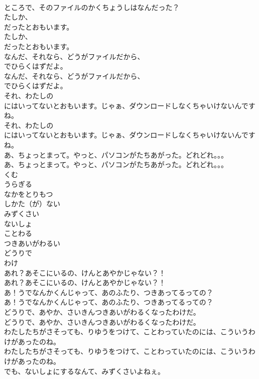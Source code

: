\documentclass[8pt]{extreport}
\begin{document}
\begin{CJK}{UTF8}{min}
\\	ところで、そのファイルのかくちょうしはなんだった？
\\	たしか、
\\	だったとおもいます。
\\	たしか、
\\	だったとおもいます。
\\	なんだ、それなら、どうがファイルだから、
\\	でひらくはずだよ。
\\	なんだ、それなら、どうがファイルだから、
\\	でひらくはずだよ。
\\	それ、わたしの
\\	にはいってないとおもいます。じゃぁ、ダウンロードしなくちゃいけないんですね。
\\	それ、わたしの
\\	にはいってないとおもいます。じゃぁ、ダウンロードしなくちゃいけないんですね。
\\	あ、ちょっとまって。やっと、パソコンがたちあがった。どれどれ。。。
\\	あ、ちょっとまって。やっと、パソコンがたちあがった。どれどれ。。。
\\	くむ
\\	うらぎる
\\	なかをとりもつ
\\	しかた（が）ない
\\	みずくさい
\\	ないしょ
\\	ことわる
\\	つきあいがわるい
\\	どうりで
\\	わけ
\\	あれ？あそこにいるの、けんとあやかじゃない？！
\\	あれ？あそこにいるの、けんとあやかじゃない？！
\\	あ！うでなんかくんじゃって、あのふたり、つきあってるっての？
\\	あ！うでなんかくんじゃって、あのふたり、つきあってるっての？
\\	どうりで、あやか、さいきんつきあいがわるくなったわけだ。
\\	どうりで、あやか、さいきんつきあいがわるくなったわけだ。
\\	わたしたちがさそっても、りゆうをつけて、ことわっていたのには、こういうわけがあったのね。
\\	わたしたちがさそっても、りゆうをつけて、ことわっていたのには、こういうわけがあったのね。
\\	でも、ないしょにするなんて、みずくさいよねぇ。

\end{CJK}
\end{document}
